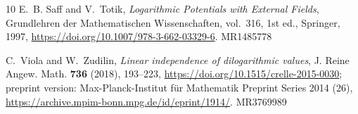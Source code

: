 \documentclass{amsart}
\numberwithin{equation}{section}
\numberwithin{table}{section}
\begin{document}
\begin{thebibliography}{10}
E.~B. Saff and V.~Totik, \emph{Logarithmic Potentials with External Fields},
Grundlehren der Mathematischen Wissenschaften, vol.~316, 1st ed., Springer, 1997,
\url{https://doi.org/10.1007/978-3-662-03329-6}. MR1485778

C.~Viola and W.~Zudilin, \emph{Linear independence of dilogarithmic values},
J. Reine Angew. Math. \textbf{736} (2018), 193--223,
\url{https://doi.org/10.1515/crelle-2015-0030}; preprint version:
Max-Planck-Institut f\"ur Mathematik Preprint Series 2014 (26),
\url{https://archive.mpim-bonn.mpg.de/id/eprint/1914/}. MR3769989

\end{thebibliography}
\end{document}
